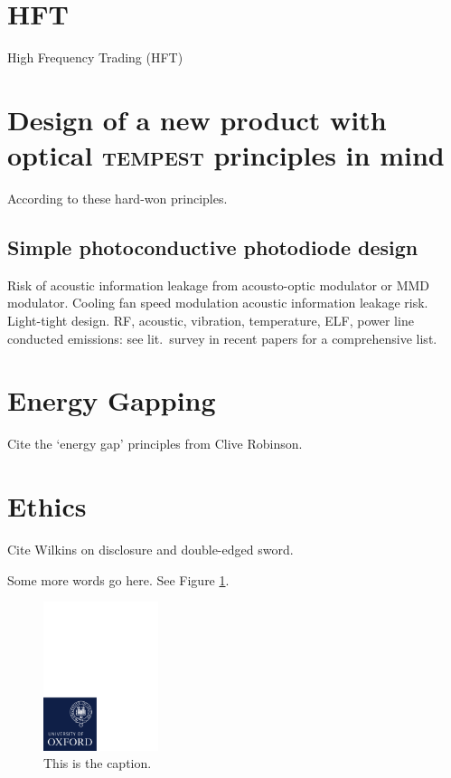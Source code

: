 \documentclass[conference]{IEEEtran}
\begin{document}
\section{HFT}

High Frequency Trading (HFT)

\section{Design of a new product with optical \textsc{tempest} principles
in mind}

According to these hard-won principles.

\subsection{Simple photoconductive photodiode design}

Risk of acoustic information leakage from acousto-optic modulator or MMD
modulator. Cooling fan speed modulation acoustic information leakage risk.
Light-tight design. RF, acoustic, vibration, temperature, ELF, power line
conducted emissions: see lit.\ survey in recent papers for a comprehensive
list.

\section{Energy Gapping}

Cite the `energy gap' principles from Clive Robinson.

\section{Ethics}

Cite Wilkins on disclosure and double-edged sword.

\newpage

Some more words go here. See Figure \ref{figure:whatever}.

\begin{figure}[!t]
    \centering
	\includegraphics[width=0.3\textwidth,trim=0 0 117mm 183mm,clip]{graphics/ox_brand_cmyk_pos.pdf}
	\caption{This is the caption.}
	\label{figure:whatever}
\end{figure}
\end{document}

